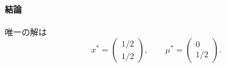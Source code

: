 \documentclass[12pt,a4paper]{article}
\begin{document}
\paragraph{結論}

唯一の解は
\[
x^* = \begin{pmatrix} 1/2 \\ 1/2 \end{pmatrix}, \qquad \mu^* = \begin{pmatrix} 0 \\ 1/2 \end{pmatrix}.\]
\end{document}
